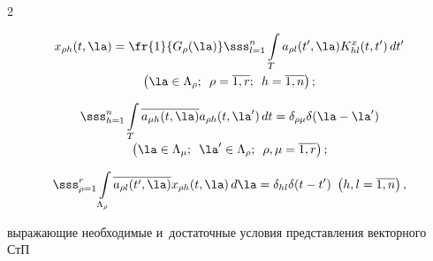 \begin{multicols}{2}
\pagebreak



\noindent

    \begin{multline}

    x_{\rho h} (t,\la) =\fr{1}{G_\rho (\la)} \sss_{l=1}^n \int\limits_T a_{\rho l} 

(t',\la)K_{hl}^x(t,t')\,dt'\\

 \left(\la\in \Lambda_\rho; \enskip 

\rho=\overline{1,r};\enskip h=\overline{1,n}\right);

\label{e2.9-s2}

\end{multline}



\vspace*{-12pt}



\noindent

 \begin{multline}

    \sss_{h=1}^n \int\limits_T \overline{a_{\mu h} (t,\la)}a_{\rho h} 

(t,\la')\,dt=\delta_{\rho \mu} \delta (\la-\la')\\[-2pt]

 \left(\la\in \Lambda_\mu; 

\enskip \la'\in \Lambda_\rho;\enskip \rho,\mu=\overline{1,r}\right);

\label{e2.10-s2}

\end{multline}



\vspace*{-6pt}



\noindent

    \begin{equation*}

    \sss_{\rho=1}^r \int\limits_{\Lambda_\rho} \overline{a_{\rho l} (t',\la)}x_{\rho 

h} (t,\la)\,d\la=\delta_{hl} \delta (t-t')\  

\left(h,l=\overline{1,n}\right),


\end{equation*}

выражающие необходимые и~достаточные условия представления векторного СтП 


\end{multicols}
